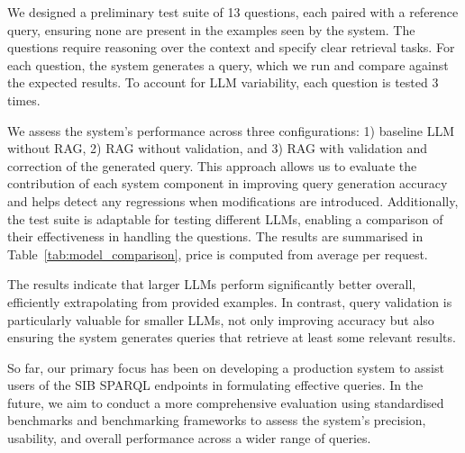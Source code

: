 \documentclass[
]{ceurart}
\begin{document}
We designed a preliminary test suite of 13 questions, each paired with a reference query, ensuring none are present in the examples seen by the system. The questions require reasoning over the context and specify clear retrieval tasks. For each question, the system generates a query, which we run and compare against the expected results. To account for LLM variability, each question is tested 3 times.

We assess the system's performance across three configurations: 1) baseline LLM without RAG, 2) RAG without validation, and 3) RAG with validation and correction of the generated query. This approach allows us to evaluate the contribution of each system component in improving query generation accuracy and helps detect any regressions when modifications are introduced. Additionally, the test suite is adaptable for testing different LLMs, enabling a comparison of their effectiveness in handling the questions. The results are summarised in Table~\ref{tab:model_comparison}, price is computed from average per request.

The results indicate that larger LLMs perform significantly better overall, efficiently extrapolating from provided examples. In contrast, query validation is particularly valuable for smaller LLMs, not only improving accuracy but also ensuring the system generates queries that retrieve at least some relevant results.



So far, our primary focus has been on developing a production system to assist users of the SIB SPARQL endpoints in formulating effective queries. In the future, we aim to conduct a more comprehensive evaluation using standardised benchmarks\cite{Dblp-quad}\cite{sciqa2023} and benchmarking frameworks\cite{meyer2024assessingsparqlcapabilitieslarge} to assess the system's precision, usability, and overall performance across a wider range of queries.
\end{document}
